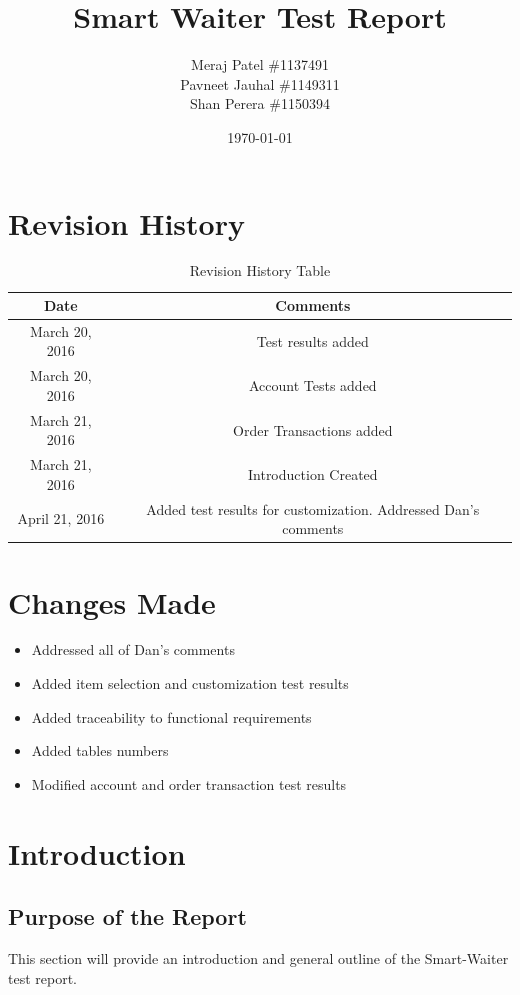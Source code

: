 \documentclass[12pt, titlepage]{article}
\begin{document}
\title{Smart Waiter Test Report} 
\author{Meraj Patel \#1137491 \\ Pavneet Jauhal \#1149311\\ Shan Perera \#1150394}
\date{\today}
\maketitle

\tableofcontents 

\listoftables

\begin{table}[H]
\section*{Revision History}
\begin{tabular}{|c|c|}
\hline
\textbf{Date}  & \textbf{Comments} \\ \hline
March 20, 2016 & Test results added \\
\hline
March 20, 2016 & Account Tests added \\
\hline
March 21, 2016 & Order Transactions added \\
\hline
March 21, 2016 & Introduction Created \\
\hline
April 21, 2016 & Added test results for customization. Addressed Dan's comments \\
\hline
\end{tabular}
\caption{Revision History Table}
\end{table}
\section{Changes Made}
\begin{itemize}
 \item Addressed all of Dan's comments
 \item Added item selection and customization test results
 \item Added traceability to functional requirements 
 \item Added tables numbers
 \item Modified account and order transaction test results
 \end{itemize}

\section{Introduction}
\label{sec:Introduction}
\subsection{Purpose of the Report}
This section will provide an introduction and general outline of the Smart-Waiter test report. 
\end{document}
